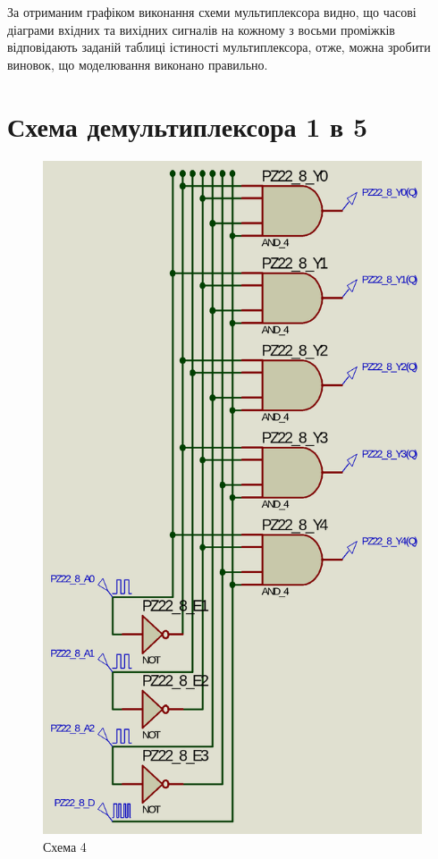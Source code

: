 \documentclass{article}
\begin{document}
\begin{normalsize}
	За отриманим графіком виконання схеми мультиплексора видно, що часові діаграми вхідних та вихідних сигналів на кожному з восьми проміжків відповідають заданій таблиці істиності мультиплексора, отже, можна зробити виновок, що моделювання виконано правильно.

	\section*{Схема демультиплексора 1 в 5}
	\begin{figure}[H]
		\centering
		\includegraphics[scale=0.34]{s4}	
		\caption{Схема 4}
	\end{figure}


\end{normalsize}
\end{document}
